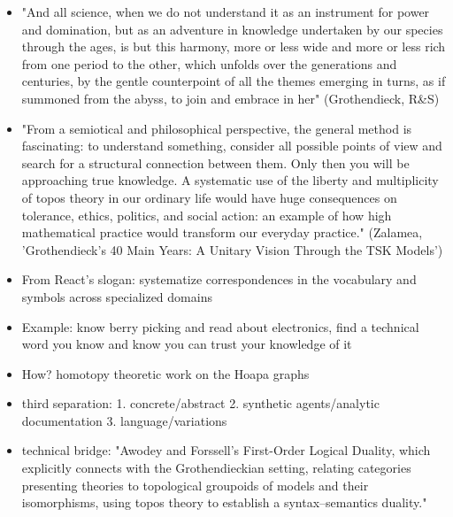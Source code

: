 \documentclass[a4paper,10pt]{article}
\newcommand{\marked}[1]{\par\addvspace{2pt}{\bfseries #1}\par\nopagebreak}
\renewenvironment{leftbar}{%
  \def\FrameCommand{{\color{black!30}\vrule width 1.2pt}\hspace{6pt}}%
  \MakeFramed{\advance\hsize-\width \FrameRestore}}{\endMakeFramed}
\newenvironment{commentary}{\par\vspace{-2pt}\begin{leftbar}\color{black!80}}{\end{leftbar}}
\begin{document}
\begin{commentary}
\marked{*}
\begin{itemize}
\item "And all science, when we do not understand it as an instrument for power and domination, but as an adventure in knowledge undertaken by our species through the ages, is but this harmony, more or less wide and more or less rich from one period to the other, which unfolds over the generations and centuries, by the gentle counterpoint of all the themes emerging in turns, as if summoned from the abyss, to join and embrace in her" (Grothendieck, R\&S)
\item "From a semiotical and philosophical perspective, the general method is fascinating: to understand something, consider all possible points of view and search for a structural connection between them. Only then you will be approaching true knowledge. A systematic use of the liberty and multiplicity of topos theory in our ordinary life would have huge consequences on tolerance, ethics, politics, and social action: an example of how high mathematical practice would transform our everyday practice." (Zalamea, 'Grothendieck’s 40 Main Years: A Unitary Vision Through the TSK Models')
\end{itemize}
\marked{\textcolor{languageamethyst}{Language}}
\begin{itemize}
\item From React's slogan: systematize correspondences in the vocabulary and symbols across specialized domains
\item Example: know berry picking and read about electronics, find a technical word you know and know you can trust your knowledge of it
\end{itemize}\vspace{2pt}
\begin{itemize}
\item How? homotopy theoretic work on the Hoapa graphs
\item third separation: 1. concrete/abstract 2. synthetic agents/analytic documentation 3. language/variations
\end{itemize}\vspace{2pt}
\begin{itemize}
\item technical bridge: "Awodey and Forssell’s First-Order Logical Duality, which explicitly connects with the Grothendieckian setting, relating categories presenting theories to topological groupoids of models and their isomorphisms, using topos theory to establish a syntax–semantics duality."

\end{itemize}
\end{commentary}
\end{document}
